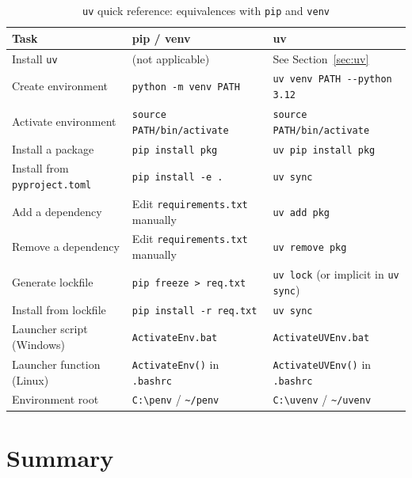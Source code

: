 \begin{table}[h]
\centering
\caption{\texttt{uv} quick reference: equivalences with \texttt{pip} and \texttt{venv}}
\label{tab:uv-cheatsheet}
\begin{tabular}{@{}p{}p{}p{}@{}}
\toprule
\textbf{Task} & \textbf{pip / venv} & \textbf{uv} \\
\midrule
Install \texttt{uv}
  & (not applicable)
  & See Section~\ref{sec:uv} \\[4pt]
Create environment
  & \texttt{python -m venv PATH}
  & \texttt{uv venv PATH -{}-python 3.12} \\[4pt]
Activate environment
  & \texttt{source PATH/bin/activate}
  & \texttt{source PATH/bin/activate} \\[4pt]
Install a package
  & \texttt{pip install pkg}
  & \texttt{uv pip install pkg} \\[4pt]
Install from \texttt{pyproject.toml}
  & \texttt{pip install -e .}
  & \texttt{uv sync} \\[4pt]
Add a dependency
  & Edit \texttt{requirements.txt} manually
  & \texttt{uv add pkg} \\[4pt]
Remove a dependency
  & Edit \texttt{requirements.txt} manually
  & \texttt{uv remove pkg} \\[4pt]
Generate lockfile
  & \texttt{pip freeze > req.txt}
  & \texttt{uv lock} (or implicit in \texttt{uv sync}) \\[4pt]
Install from lockfile
  & \texttt{pip install -r req.txt}
  & \texttt{uv sync} \\[4pt]
Launcher script (Windows)
  & \texttt{ActivateEnv.bat}
  & \texttt{ActivateUVEnv.bat} \\[4pt]
Launcher function (Linux)
  & \texttt{ActivateEnv()} in \texttt{.bashrc}
  & \texttt{ActivateUVEnv()} in \texttt{.bashrc} \\[4pt]
Environment root
  & \texttt{C:\textbackslash penv} / \texttt{\textasciitilde/penv}
  & \texttt{C:\textbackslash uvenv} / \texttt{\textasciitilde/uvenv} \\
\bottomrule
\end{tabular}
\end{table}

\section{Summary}
\label{sec:summary}

